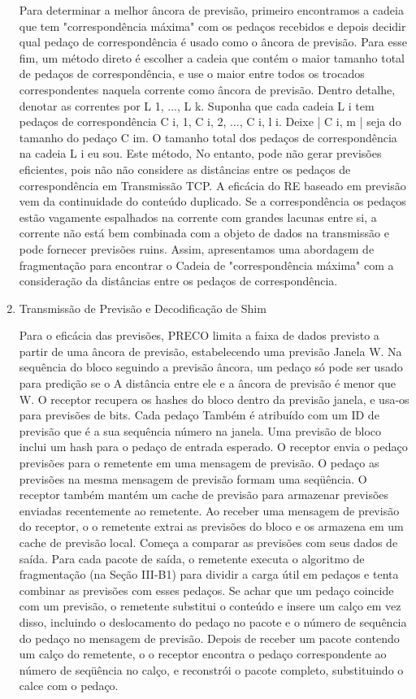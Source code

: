 \documentclass[12pt]{article}
\begin{document}
\begin{enumerate}
	Para determinar a melhor âncora de previsão, primeiro encontramos a
	cadeia que tem "correspondência máxima" com os pedaços recebidos
	e depois decidir qual pedaço de correspondência é usado como o
	âncora de previsão. Para esse fim, um método direto
	é escolher a cadeia que contém o maior tamanho total
	de pedaços de correspondência, e use o maior entre todos os
	trocados correspondentes naquela corrente como âncora de previsão. Dentro
	detalhe, denotar as correntes por L 1, ..., L k. Suponha que cada cadeia L i
	tem pedaços de correspondência {C i, 1, C i, 2, ..., C i, l i}. Deixe | C i, m | seja do tamanho
	do pedaço C im. O tamanho total dos pedaços de correspondência na cadeia L i
	eu sou.
	 Este método,
	No entanto, pode não gerar previsões eficientes, pois não
	não considere as distâncias entre os pedaços de correspondência em
	Transmissão TCP. A eficácia do RE baseado em previsão vem
	da continuidade do conteúdo duplicado. Se a correspondência
	os pedaços estão vagamente espalhados na corrente com grandes lacunas
	entre si, a corrente não está bem combinada com a
	objeto de dados na transmissão e pode fornecer previsões ruins.
	Assim, apresentamos uma abordagem de fragmentação para encontrar o
	Cadeia de "correspondência máxima" com a consideração da
	distâncias entre os pedaços de correspondência.
	
	\item 
	Transmissão de Previsão e Decodificação de Shim
	
	Para o
	eficácia das previsões, PRECO limita a faixa de dados
	previsto a partir de uma âncora de previsão, estabelecendo uma previsão
	Janela W. Na sequência do bloco seguindo a previsão
	âncora, um pedaço só pode ser usado para predição se o
	A distância entre ele e a âncora de previsão é menor que W.
	O receptor recupera os hashes do bloco dentro da previsão
	janela, e usa-os para previsões de bits. Cada pedaço
	Também é atribuído com um ID de previsão que é a sua sequência
	número na janela. Uma previsão de bloco inclui um hash para
	o pedaço de entrada esperado. O receptor envia o pedaço
	previsões para o remetente em uma mensagem de previsão. O pedaço
	as previsões na mesma mensagem de previsão formam uma seqüência.
	O receptor também mantém um cache de previsão para armazenar
	previsões enviadas recentemente ao remetente.
	Ao receber uma mensagem de previsão do receptor, o
	o remetente extrai as previsões do bloco e os armazena em um
	cache de previsão local. Começa a comparar as previsões
	com seus dados de saída. Para cada pacote de saída, o remetente
	executa o algoritmo de fragmentação (na Seção III-B1) para dividir
	a carga útil em pedaços e tenta combinar as previsões
	com esses pedaços. Se achar que um pedaço coincide com um
	previsão, o remetente substitui o conteúdo e insere um calço
	em vez disso, incluindo o deslocamento do pedaço no pacote e
	o número de sequência do pedaço no mensagem de previsão.
	Depois de receber um pacote contendo um calço do remetente, o
	o receptor encontra o pedaço correspondente ao número de seqüência
	no calço, e reconstrói o pacote completo, substituindo o
	calce com o pedaço.
		\end{enumerate}
\end{document}
